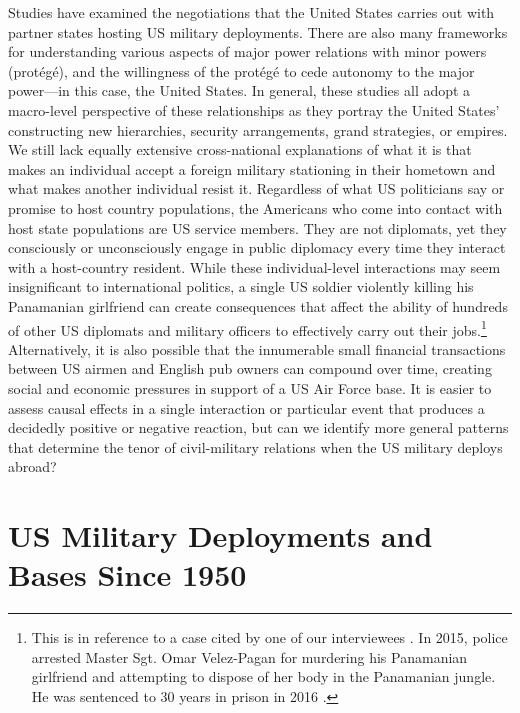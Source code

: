 Studies have examined the negotiations that the United States carries out with partner states hosting US military deployments.\autocite{McDonald1990} There are also many frameworks for understanding various aspects of major power relations with minor powers (prot\'{e}g\'{e}), and the willingness of the prot\'{e}g\'{e} to cede autonomy to the major power---in this case, the United States. In general, these studies all adopt a macro-level perspective of these relationships as they portray the United States' constructing new hierarchies, security arrangements, grand strategies, or empires.\autocite{Ikenberry2004,Johnson2004,Bacevich2009,Lake2009a} We still lack equally extensive cross-national explanations of what it is that makes an individual accept a foreign military stationing in their hometown and what makes another individual resist it. Regardless of what US politicians say or promise to host country populations, the Americans who come into contact with host state populations are US service members. They are not diplomats, yet they consciously or unconsciously engage in public diplomacy every time they interact with a host-country resident. While these individual-level interactions may seem insignificant to international politics, a single US soldier violently killing his Panamanian girlfriend can create consequences that affect the ability of hundreds of other US diplomats and military officers to effectively carry out their jobs.\footnote{This is in reference to a case cited by one of our interviewees \autocite[see:][]{amb20180713}. In 2015, police arrested Master Sgt. Omar Velez-Pagan for murdering his Panamanian girlfriend and attempting to dispose of her body in the Panamanian jungle. He was sentenced to 30 years in prison in 2016 \autocite[see:][]{ChicagoTribune2016}.} Alternatively, it is also possible that the innumerable small financial transactions between US airmen and English pub owners can compound over time, creating social and economic pressures in support of a US Air Force base. It is easier to assess causal effects in a single interaction or particular event that produces a decidedly positive or negative reaction, but can we identify more general patterns that determine the tenor of civil-military relations when the US military deploys abroad? 


\section*{US Military Deployments and Bases Since 1950}

